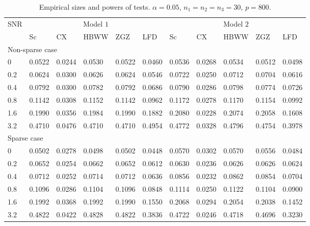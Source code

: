 \documentclass[12pt]{article} %
\theoremstyle{definition}
\begin{document}
\begin{table}[!hbp]
    \caption{Empirical sizes and powers of tests. $\alpha=0.05$, $n_1=n_2=n_3=30$, $p=800$. }
    \label{table3}
    \centering
    \begin{tabular}{*{11}{l}}
    \toprule
    \multirow{2}{*}{SNR} &\multicolumn{5}{c}{Model $1$}&
    \multicolumn{5}{c}{Model $2$} \\
        \cmidrule(r){2-6}\cmidrule(r){7-11}
& Sc & CX & HBWW & ZGZ & LFD & Sc & CX & HBWW & ZGZ & LFD \\ 
    \midrule
    \multicolumn{5}{l}{Non-sparse case}
    \\
    \midrule
0 & 0.0522 & 0.0244 & 0.0530 & 0.0522 & 0.0460 & 0.0536 & 0.0268 & 0.0534 & 0.0512 & 0.0498 \\ 
  0.2& 0.0624 & 0.0300 & 0.0626 & 0.0624 & 0.0546 & 0.0722 & 0.0250 & 0.0712 & 0.0704 & 0.0616 \\ 
  0.4& 0.0792 & 0.0300 & 0.0782 & 0.0792 & 0.0686 & 0.0790 & 0.0286 & 0.0798 & 0.0774 & 0.0726 \\ 
  0.8& 0.1142 & 0.0308 & 0.1152 & 0.1142 & 0.0962 & 0.1172 & 0.0278 & 0.1170 & 0.1154 & 0.0992 \\ 
  1.6& 0.1990 & 0.0356 & 0.1984 & 0.1990 & 0.1882 & 0.2080 & 0.0228 & 0.2074 & 0.2058 & 0.1608 \\ 
  3.2& 0.4710 & 0.0476 & 0.4710 & 0.4710 & 0.4954 & 0.4772 & 0.0328 & 0.4796 & 0.4754 & 0.3978 \\ 


    \midrule
    \multicolumn{5}{l}{Sparse case}
    \\
    \midrule

    
  0& 0.0502 & 0.0278 & 0.0498 & 0.0502 & 0.0448 & 0.0570 & 0.0302 & 0.0570 & 0.0556 & 0.0484 \\ 
  0.2& 0.0652 & 0.0254 & 0.0662 & 0.0652 & 0.0612 & 0.0630 & 0.0236 & 0.0626 & 0.0626 & 0.0624 \\ 
  0.4& 0.0712 & 0.0252 & 0.0714 & 0.0712 & 0.0636 & 0.0856 & 0.0232 & 0.0862 & 0.0854 & 0.0704 \\ 
  0.8& 0.1096 & 0.0286 & 0.1104 & 0.1096 & 0.0848 & 0.1114 & 0.0250 & 0.1122 & 0.1104 & 0.0900 \\ 
  1.6& 0.1992 & 0.0368 & 0.1992 & 0.1990 & 0.1550 & 0.2068 & 0.0294 & 0.2054 & 0.2038 & 0.1452 \\ 
  3.2& 0.4822 & 0.0422 & 0.4828 & 0.4822 & 0.3836 & 0.4722 & 0.0246 & 0.4718 & 0.4696 & 0.3230 \\ 




\bottomrule
\end{tabular}
\end{table}
\end{document}
